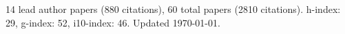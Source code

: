 14 lead author papers (880 citations),
60 total papers (2810 citations).\newline
h-index: 29, g-index: 52, i10-index: 46. Updated \today.